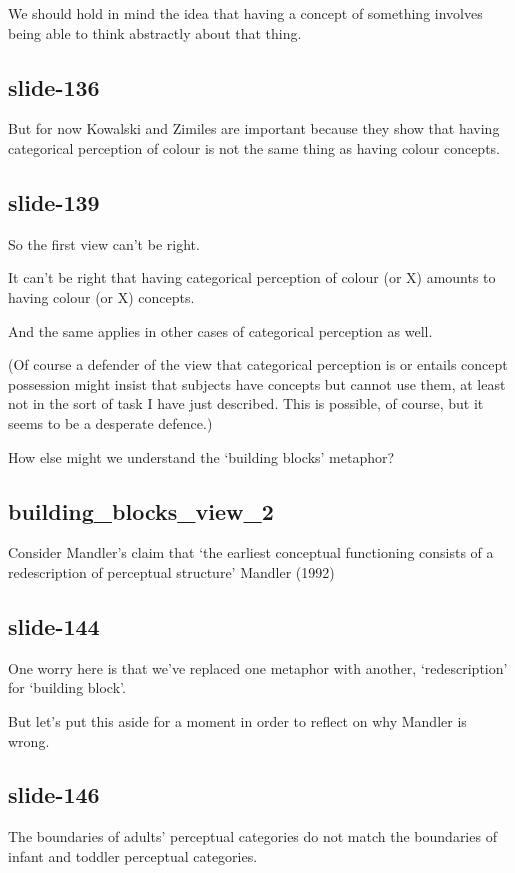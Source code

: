 \documentclass[12pt,\papersize]{extarticle}
\begin{document}
We should hold in mind the idea that having a concept of something involves being able to think abstractly about that thing.
 
\subsection{slide-136}
But for now Kowalski and Zimiles are important because they show that having categorical perception of colour is not the same thing as having colour concepts.
 
\subsection{slide-139}
So the first view can't be right.
 
It can't be right that having categorical perception of colour (or X) amounts to having colour (or X) concepts.
 
And the same applies in other cases of categorical perception as well.
 
(Of course a defender of the view that categorical perception is or entails concept possession might insist that subjects have concepts but cannot use them, at least not in the sort of task I have just described.  This is possible, of course, but it seems to be a desperate defence.)
 
How else might we understand the ‘building blocks’ metaphor?
 
\subsection{building\_blocks\_view\_2}
Consider Mandler's claim that ‘the earliest conceptual functioning consists of a redescription of perceptual structure’ 
Mandler (1992)

 
\subsection{slide-144}
One worry here is that we've replaced one metaphor with another, ‘redescription’ for ‘building block’.
 
But let's put this aside for a moment in order to reflect on why Mandler is wrong.
 
\subsection{slide-146}
The boundaries of adults' perceptual categories do not match the boundaries of infant and toddler perceptual categories.
 
\end{document}
